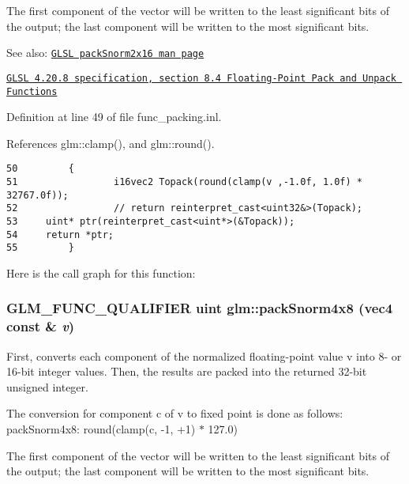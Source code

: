 The first component of the vector will be written to the least significant bits of the output; the last component will be written to the most significant bits.

\begin{Desc}
\item[See also:]\href{http://www.opengl.org/sdk/docs/manglsl/xhtml/packSnorm2x16.xml}{\tt GLSL packSnorm2x16 man page} 

\href{http://www.opengl.org/registry/doc/GLSLangSpec.4.20.8.pdf}{\tt GLSL 4.20.8 specification, section 8.4 Floating-Point Pack and Unpack Functions} \end{Desc}


Definition at line 49 of file func\_\-packing.inl.

References glm::clamp(), and glm::round().

\begin{Code}\begin{verbatim}50         {
51                 i16vec2 Topack(round(clamp(v ,-1.0f, 1.0f) * 32767.0f));
52                 // return reinterpret_cast<uint32&>(Topack);
53     uint* ptr(reinterpret_cast<uint*>(&Topack));
54     return *ptr;
55         }
\end{verbatim}
\end{Code}




Here is the call graph for this function:\hypertarget{group__core__func__packing_gfcf25acc0d361c6c696a433aa5dfd16b}{
\subsubsection[packSnorm4x8]{\setlength{\rightskip}{0pt plus 5cm}GLM\_\-FUNC\_\-QUALIFIER uint glm::packSnorm4x8 (vec4 const \& {\em v})}}
\label{group__core__func__packing_gfcf25acc0d361c6c696a433aa5dfd16b}


First, converts each component of the normalized floating-point value v into 8- or 16-bit integer values. Then, the results are packed into the returned 32-bit unsigned integer.

The conversion for component c of v to fixed point is done as follows: packSnorm4x8: round(clamp(c, -1, +1) $\ast$ 127.0)

The first component of the vector will be written to the least significant bits of the output; the last component will be written to the most significant bits.

